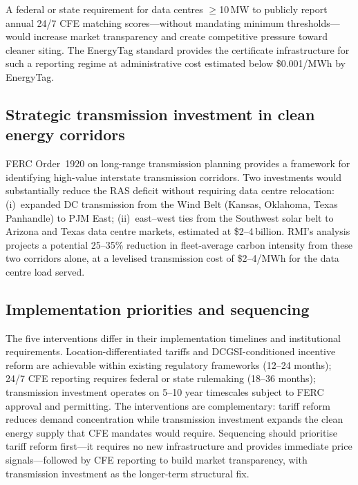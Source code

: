 \documentclass[preprint,12pt]{elsarticle}
\begin{document}
A federal or state requirement for data centres $\geq$10\,MW to publicly
report annual 24/7 CFE matching scores---without mandating minimum
thresholds---would increase market transparency and create competitive
pressure toward cleaner siting. The EnergyTag standard \cite{energytag2022}
provides the certificate infrastructure for such a reporting regime at
administrative cost estimated below \$0.001/MWh by EnergyTag.

\subsection{Strategic transmission investment in clean energy corridors}
\label{subsec:policy_transmission}

FERC Order~1920 on long-range transmission planning \cite{ferc_order1920}
provides a framework for identifying high-value interstate transmission
corridors. Two investments would substantially reduce the RAS deficit
without requiring data centre relocation:
(i)~expanded DC transmission from the Wind Belt (Kansas, Oklahoma, Texas
Panhandle) to PJM East;
(ii)~east--west ties from the Southwest solar belt to Arizona and Texas
data centre markets, estimated at \$2--4\,billion.
RMI's analysis projects a potential 25--35\% reduction in fleet-average
carbon intensity from these two corridors alone, at a levelised
transmission cost of \$2--4/MWh for the data centre load served.

\subsection{Implementation priorities and sequencing}
\label{subsec:policy_sequencing}

The five interventions differ in their implementation timelines and
institutional requirements. Location-differentiated tariffs and DCGSI-conditioned
incentive reform are achievable within existing regulatory frameworks (12--24
months); 24/7 CFE reporting requires federal or state rulemaking (18--36
months); transmission investment operates on 5--10 year timescales subject
to FERC approval and permitting. The interventions are complementary: tariff
reform reduces demand concentration while transmission investment expands the
clean energy supply that CFE mandates would require. Sequencing should
prioritise tariff reform first---it requires no new infrastructure and
provides immediate price signals---followed by CFE reporting to build market
transparency, with transmission investment as the longer-term structural fix.
\end{document}
